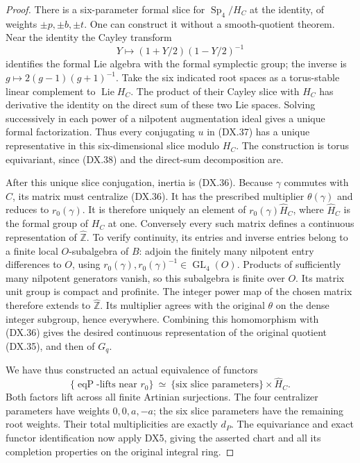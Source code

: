 \begin{proof}
There is a six-parameter formal slice for
$\operatorname{Sp}_4/H_C$ at the identity, of weights
$\pm p,\pm b,\pm t$.
One can construct it without a smooth-quotient theorem.
Near the identity the Cayley transform
\[
               Y\longmapsto(1+Y/2)(1-Y/2)^{-1}
 \tag{DX.38}
\]
identifies the formal Lie algebra with the formal
symplectic group; the inverse is
$g\mapsto2(g-1)(g+1)^{-1}$.
Take the six indicated root spaces as a torus-stable
linear complement to $\operatorname{Lie}H_C$.
The product of their Cayley slice with $H_C$ has derivative
the identity on the direct sum of these two Lie spaces.
Solving successively in each power of a nilpotent
augmentation ideal gives a unique formal factorization.
Thus every conjugating $u$ in (DX.37) has a unique
representative in this six-dimensional slice modulo
$H_C$.
The construction is torus equivariant, since (DX.38)
and the direct-sum decomposition are.

After this unique slice conjugation, inertia is (DX.36).
Because $\gamma$ commutes with $C$, its matrix must
centralize (DX.36).
It has the prescribed multiplier $\theta(\gamma)$
and reduces to $r_0(\gamma)$.
It is therefore uniquely an element of
$r_0(\gamma)\widehat H_C$, where $\widehat H_C$
is the formal group of $H_C$ at one.
Conversely every such matrix defines a continuous
representation of $\widehat{\mathbb Z}$.
To verify continuity, its entries and inverse entries
belong to a finite local $O$-subalgebra of $B$:
adjoin the finitely many nilpotent entry differences to
$O$, using $r_0(\gamma),r_0(\gamma)^{-1}\in\operatorname{GL}_4(O)$.
Products of sufficiently many nilpotent generators vanish,
so this subalgebra is finite over $O$.
Its matrix unit group is compact and profinite.
The integer power map of the chosen matrix therefore
extends to $\widehat{\mathbb Z}$.
Its multiplier agrees with the original $\theta$
on the dense integer subgroup, hence everywhere.
Combining this homomorphism with (DX.36) gives the
desired continuous representation of the original quotient
(DX.35), and then of $G_q$.

We have thus constructed an actual equivalence of functors
\[
 \{\operatorname{eqP}\text{-lifts near }r_0\}
   \ \simeq\
 \{\text{six slice parameters}\}\times\widehat H_C .
 \tag{DX.39}
\]
Both factors lift across all finite Artinian surjections.
The four centralizer parameters have weights $0,0,a,-a$;
the six slice parameters have the remaining root weights.
Their total multiplicities are exactly $d_P$.
The equivariance and exact functor identification now
apply DX5, giving the asserted chart and all its
completion properties on the original integral ring.
\end{proof}

